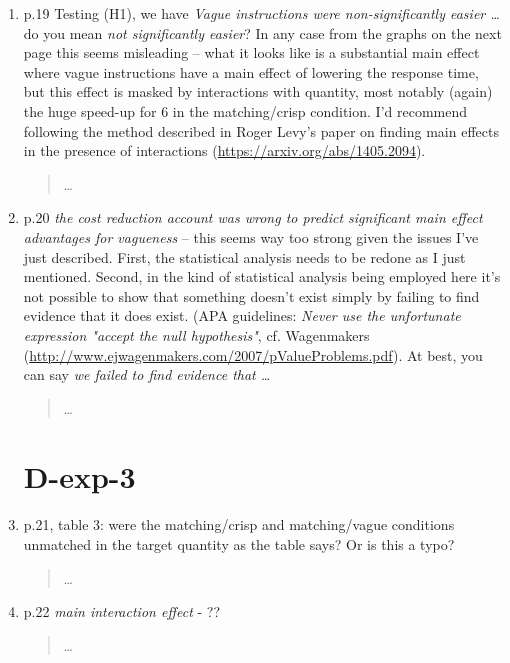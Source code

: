 \documentclass{tufte-handout}
\begin{document}
\begin{enumerate}
\item p.19 Testing (H1), we have \emph{Vague instructions were non-significantly easier \ldots} do you mean \emph{not significantly easier}? In any case from the graphs on the next page this seems misleading -- what it looks like is a substantial main effect where vague instructions have a main effect of lowering the response time, but this effect is masked by interactions with quantity, most notably (again) the huge speed-up for 6 in the matching/crisp condition. I'd recommend following the method described in Roger Levy's paper on finding main effects in the presence of interactions (\url{https://arxiv.org/abs/1405.2094}).
\begin{quote}\ldots\end{quote}

\item p.20 \emph{the cost reduction account was wrong to predict significant main effect advantages for vagueness} -- this seems way too strong given the issues I've just described. First, the statistical analysis needs to be redone as I just mentioned. Second, in the kind of statistical analysis being employed here it's not possible to show that something doesn't exist simply by failing to find evidence that it does exist. (APA guidelines: \emph{Never use the unfortunate expression "accept the null hypothesis"}, cf. Wagenmakers (\url{http://www.ejwagenmakers.com/2007/pValueProblems.pdf}). At best, you can say \emph{we failed to find evidence that \ldots}
\begin{quote}\ldots\end{quote}

\section{D-exp-3}

\item p.21, table 3: were the matching/crisp and matching/vague conditions unmatched in the target quantity as the table says? Or is this a typo?
\begin{quote}\ldots\end{quote}

\item p.22 \emph{main interaction effect} - ??
\begin{quote}\ldots\end{quote}


\end{enumerate}
\end{document}
